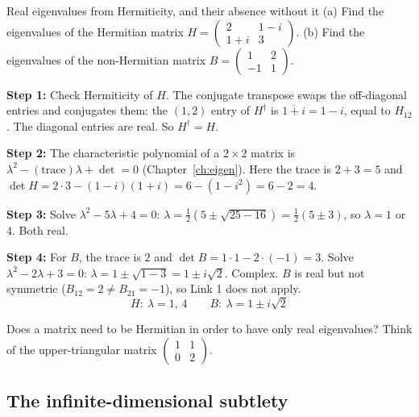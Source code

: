 \begin{sample}{Real eigenvalues from Hermiticity, and their absence without it}
(a) Find the eigenvalues of the Hermitian matrix $H=\begin{pmatrix}2&1-i\\1+i&3\end{pmatrix}$. (b) Find the eigenvalues of the non-Hermitian matrix $B=\begin{pmatrix}1&2\\-1&1\end{pmatrix}$.

\textbf{Step 1:} Check Hermiticity of $H$. The conjugate transpose swaps the off-diagonal entries and conjugates them: the $(1,2)$ entry of $H^\dagger$ is $\overline{1+i}=1-i$, equal to $H_{12}$. The diagonal entries are real. So $H^\dagger=H$.

\textbf{Step 2:} The characteristic polynomial of a $2\times2$ matrix is $\lambda^2-(\text{trace})\lambda+\det=0$ (Chapter~\ref{ch:eigen}). Here the trace is $2+3=5$ and $\det H=2\cdot3-(1-i)(1+i)=6-(1-i^2)=6-2=4$.

\textbf{Step 3:} Solve $\lambda^2-5\lambda+4=0$: $\lambda=\tfrac12\left(5\pm\sqrt{25-16}\right)=\tfrac12(5\pm3)$, so $\lambda=1$ or $4$. Both real.

\textbf{Step 4:} For $B$, the trace is $2$ and $\det B=1\cdot1-2\cdot(-1)=3$. Solve $\lambda^2-2\lambda+3=0$: $\lambda=1\pm\sqrt{1-3}=1\pm i\sqrt2$. Complex. $B$ is real but not symmetric ($B_{12}=2\ne B_{21}=-1$), so Link 1 does not apply.
\[
\boxed{H:\ \lambda=1,\,4\qquad B:\ \lambda=1\pm i\sqrt2}
\]
\end{sample}

\begin{checkpoint}
Does a matrix need to be Hermitian in order to have only real eigenvalues? Think of the upper-triangular matrix $\begin{pmatrix}1&1\\0&2\end{pmatrix}$.
\end{checkpoint}

\subsection{The infinite-dimensional subtlety}

